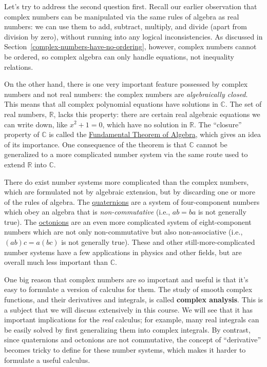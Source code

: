 \documentclass[10pt,a4paper]{article}
\begin{document}
Let's try to address the second question first. Recall our earlier
observation that complex numbers can be manipulated via the same rules
of algebra as real numbers: we can use them to add, subtract,
multiply, and divide (apart from division by zero), without running
into any logical inconsistencies. As discussed in
Section~\ref{complex-numbers-have-no-ordering}, however, complex
numbers cannot be ordered, so complex algebra can only handle
equations, not inequality relations.

On the other hand, there is one very important feature possessed by
complex numbers and not real numbers: the complex numbers are
\emph{algebraically closed}. This means that all complex polynomial
equations have solutions in $\mathbb{C}$. The set of real numbers,
$\mathbb{R}$, lacks this property: there are certain real algebraic
equations we can write down, like $x^2 + 1 = 0$, which have no
solution in $\mathbb{R}$. The ``closure'' property of $\mathbb{C}$
is called the
\href{https://en.wikipedia.org/wiki/Fundamental_theorem_of_algebra}{Fundamental
Theorem of Algebra}, which gives an idea of its importance. One
consequence of the theorem is that $\mathbb{C}$ cannot be generalized
to a more complicated number system via the same route used to extend
$\mathbb{R}$ into $\mathbb{C}$.

There do exist number systems more complicated than the complex numbers,
which are formulated not by algebraic extension, but by discarding one
or more of the rules of algebra. The
\href{https://en.wikipedia.org/wiki/Quaternion}{quaternions} are a
system of four-component numbers which obey an algebra that is
\emph{non-commutative} (i.e., $ab = ba$ is not generally true). The
\href{https://en.wikipedia.org/wiki/Octonion}{octonions} are an even
more complicated system of eight-component numbers which are not only
non-commutative but also non-associative (i.e., $(ab)c = a(bc)$ is not
generally true). These and other still-more-complicated number systems
have a few applications in physics and other fields, but are overall
much less important than $\mathbb{C}$.

One big reason that complex numbers are so important and useful is
that it's easy to formulate a version of calculus for them. The study
of smooth complex functions, and their derivatives and integrals, is
called \textbf{complex analysis}. This is a subject that we will
discuss extensively in this course.  We will see that it has important
implications for the \emph{real} calculus; for example, many real
integrals can be easily solved by first generalizing them into complex
integrals. By contrast, since quaternions and octonions are not
commutative, the concept of ``derivative'' becomes tricky to define
for these number systems, which makes it harder to formulate a useful
calculus.
\end{document}

